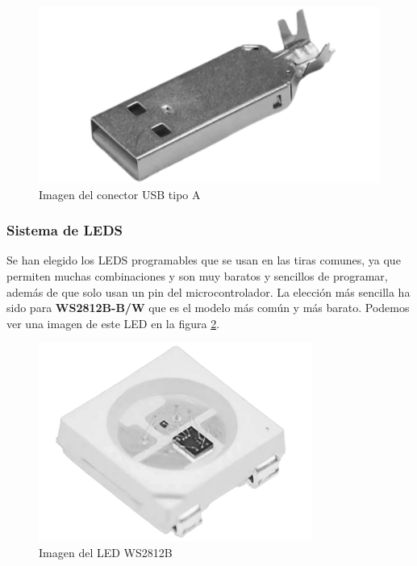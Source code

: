 \begin{figure}[H]
    \centering
    \includegraphics[width=1\textwidth]{imagenes/Capitulos/Cap03/USBA.png}
    \caption{Imagen del conector \gls{USB} tipo A}
    \label{fig:USBA}
\end{figure}


\subsubsection{Sistema de \gls{LED}S} \label{DiseñoLeds}
Se han elegido los \gls{LED}S programables que se usan en las tiras comunes, ya que permiten muchas combinaciones y son muy baratos y sencillos de programar, además de que solo usan un pin del microcontrolador. La elección más sencilla ha sido para \textbf{WS2812B-B/W} que es el modelo más común y más barato. Podemos ver una imagen de este \gls{LED} en la figura \ref{fig:WS2812B}.

\begin{figure}[H]
    \centering
    \includegraphics[width=0.8\textwidth]{imagenes/Capitulos/Cap03/WS2812B.png}
    \caption{Imagen del \gls{LED} WS2812B}
    \label{fig:WS2812B}
\end{figure}

